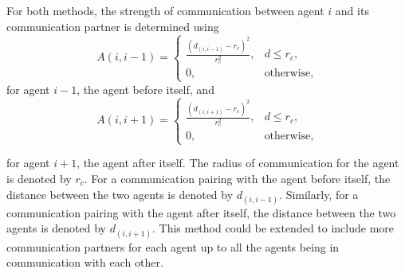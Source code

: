 \documentclass[../CourseManual.tex]{subfiles}
\begin{document}
For both methods, the strength of communication between agent $i$ and its communication partner is determined using
\[
A(i,i-1) = 
\begin{cases}
 \frac{(d_{(i,i-1)}-r_c)^2}{r_c^2} , & d \leq r_c,\\
 0, & \text{otherwise,}
\end{cases}
\]
for agent $i-1$, the agent before itself, and 
\[
A(i,i+1) = 
\begin{cases}
 \frac{(d_{(i,i+1)}-r_c)^2}{r_c^2} , & d \leq r_c,\\
 0, & \text{otherwise,}
\end{cases}
\]

for agent $i+1$, the agent after itself. The radius of communication for the agent is denoted by $r_c$. For a communication pairing with the agent before itself, the distance between the two agents is denoted by $d_{(i,i-1)}$. Similarly, for a communication pairing with the agent after itself, the distance between the two agents is denoted by $d_{(i,i+1)}$. This method could be extended to include more communication partners for each agent up to all the agents being in communication with each other. \\

\end{document}
